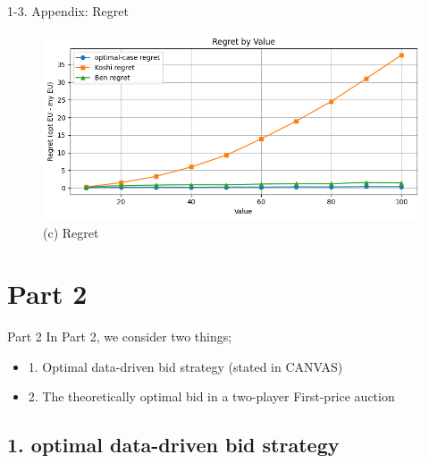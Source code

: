\documentclass{beamer}
\begin{document}
\begin{frame}{1-3. Appendix: Regret}
    \begin{figure}
        \centering
        \includegraphics[width=1\linewidth]{332Project1/figures/regret.png}
    \vspace{0.4em}
    {\footnotesize (c) Regret}
    \end{figure}
\end{frame}

\section{Part 2}

\begin{frame}{Part 2}
    In Part 2, we consider two things; 
    \medskip
    \begin{itemize}
        \item 1. Optimal data-driven bid strategy (stated in CANVAS)
        \item 2. The theoretically optimal bid in a two-player First-price auction
    \end{itemize}
\end{frame}

\subsection{1. optimal data-driven bid strategy}
\end{document}
